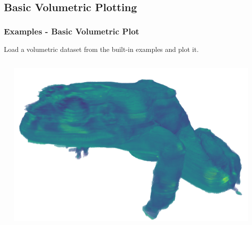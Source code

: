 \documentclass[t]{beamer}
\renewcommand{\footnotesize}{\scriptsize}
\begin{document}
\subsection{Basic Volumetric Plotting}
\begin{frame}
    \frametitle{Examples - Basic Volumetric Plot}

    Load a volumetric dataset from the built-in examples and plot it.

    \begin{center}
        \begin{columns}[T]
            \begin{column}{.5\textwidth}
                \inputminted[fontsize=\footnotesize]{python}{code/basic_usage2.py}
            \end{column}

            \begin{column}{.5\textwidth}
                \centering
                \vspace{5pt}
                \includegraphics[width=1.0\textwidth]{figures/basic_usage2_trans.png}
            \end{column}
        \end{columns}
    \end{center}

\end{frame}

\end{document}

